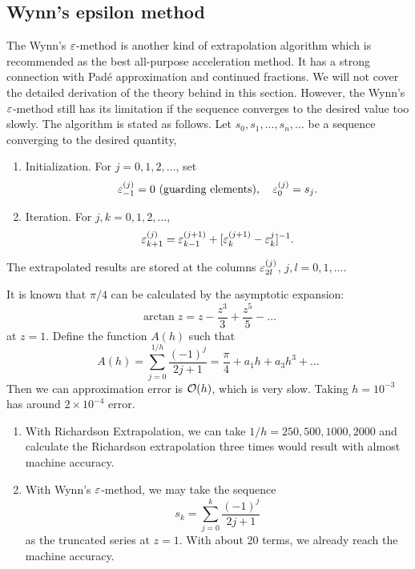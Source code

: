 \subsection{Wynn's epsilon method}
The Wynn's $\varepsilon$-method is another kind of extrapolation algorithm which is recommended as the best all-purpose acceleration method. It has a strong connection with Pad\'e approximation and continued fractions. We will not cover the detailed derivation of the theory behind in this section. However, the Wynn's $\varepsilon$-method still has its limitation if the sequence converges to the desired value too slowly. The algorithm is stated as follows. Let $s_0, s_1, \dots, s_n,\dots$ be a sequence converging to the desired quantity,
\begin{enumerate}
    \item Initialization. For $j = 0, 1, 2,\dots$, set 
    $$\varepsilon_{-1}^{(j)} = 0 \text{ (guarding elements)}, \quad \varepsilon_{0}^{(j)} = s_j.$$
    \item Iteration. For $j,k = 0,1,2,\dots$, 
    $$\varepsilon_{k+1}^{(j)} = \varepsilon_{k-1}^{(j+1)} + [\varepsilon_{k}^{(j+1)} - \varepsilon_{k}^{j}]^{-1}.$$
\end{enumerate}
The extrapolated results are stored at the columns $\varepsilon_{2l}^{(j)}$, $j, l=0,1, \dots$.
\begin{example}
    It is known that $\pi/4$ can be calculated by the asymptotic expansion:
    \begin{equation}
        \arctan z = z - \frac{z^3}{3} + \frac{z^5}{5} - \dots 
    \end{equation}
    at $z = 1$. Define the function $A(h)$ such that 
    \begin{equation}
        A(h)= \sum_{j=0}^{1/h} \frac{(-1)^j}{2 j + 1} = \frac{\pi}{4} + a_1 h + a_3 h^3 + \dots
    \end{equation}
    Then we can approximation error is $\mathcal O(h)$, which is very slow. Taking $h=10^{-3}$ has around $2\times 10^{-4}$ error. 
    \begin{enumerate}
        \item     With Richardson Extrapolation, we can take $1/h = 250, 500, 1000, 2000$ and calculate the Richardson extrapolation three times would result with almost machine accuracy.
        \item With Wynn's $\varepsilon$-method, we may take the sequence 
        $$s_k = \sum_{j=0}^k \frac{(-1)^j}{2 j + 1}$$
        as the truncated series at $z = 1$. With about 20 terms, we already reach the machine accuracy.
    \end{enumerate}

\end{example}
